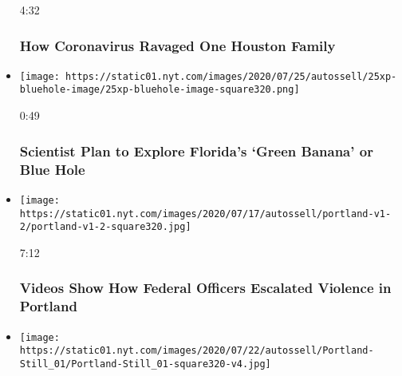 \begin{itemize}
  4:32

  \hypertarget{how-coronavirus-ravaged-one-houston-family}{%
  \subsubsection{How Coronavirus Ravaged One Houston
  Family}\label{how-coronavirus-ravaged-one-houston-family}}
\item
  \href{https://www.nytimes.com/video/us/100000007255617/florida-green-banana-bluehole.html?action=click\&module=video-series-bar\&region=header\&pgtype=Article\&playlistId=video/u-s}{}

  \texttt{[image: https://static01.nyt.com/images/2020/07/25/autossell/25xp-bluehole-image/25xp-bluehole-image-square320.png]}

  0:49

  \hypertarget{scientist-plan-to-explore-floridas-green-banana-or-blue-hole}{%
  \subsubsection{Scientist Plan to Explore Florida's `Green Banana' or
  Blue
  Hole}\label{scientist-plan-to-explore-floridas-green-banana-or-blue-hole}}
\item
  \href{https://www.nytimes.com/video/us/100000007243995/portland-protests-federal-government.html?action=click\&module=video-series-bar\&region=header\&pgtype=Article\&playlistId=video/u-s}{}

  \texttt{[image: https://static01.nyt.com/images/2020/07/17/autossell/portland-v1-2/portland-v1-2-square320.jpg]}

  7:12

  \hypertarget{videos-show-how-federal-officers-escalated-violence-in-portland}{%
  \subsubsection{Videos Show How Federal Officers Escalated Violence in
  Portland}\label{videos-show-how-federal-officers-escalated-violence-in-portland}}
\item
  \href{https://www.nytimes.com/video/us/100000007250985/they-pushed-portland-too-far-trump-crackdown-strengthens-protests.html?action=click\&module=video-series-bar\&region=header\&pgtype=Article\&playlistId=video/u-s}{}

  \texttt{[image: https://static01.nyt.com/images/2020/07/22/autossell/Portland-Still\_01/Portland-Still\_01-square320-v4.jpg]}


\end{itemize}
